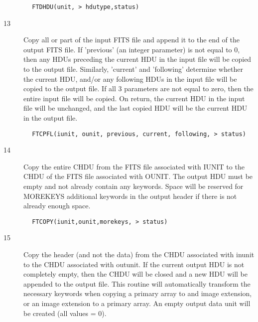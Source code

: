 \documentclass[11pt]{book}
\begin{document}
\begin{verbatim}
        FTDHDU(unit, > hdutype,status)
\end{verbatim}

\begin{description}
\item[13]  Copy all or part of the input FITS file and append it
    to the end of the output FITS file.  If 'previous' (an integer parameter) is
    not equal to 0, then any HDUs preceding the current HDU in the input file
    will be copied to the output file.  Similarly, 'current' and 'following'
    determine whether the current HDU, and/or any following HDUs in the input
    file will be copied to the output file. If all 3 parameters are not equal
    to zero, then the entire input file will be copied.  On return, the current
    HDU in the input file will be unchanged, and the last copied HDU will be the
   current HDU in the output file.
\end{description}

\begin{verbatim}
        FTCPFL(iunit, ounit, previous, current, following, > status)
\end{verbatim}

\begin{description}
\item[14] Copy the entire CHDU from the FITS file associated with IUNIT to the CHDU
    of the FITS file associated with OUNIT. The output HDU must be empty and
    not already contain any keywords.  Space will be reserved for MOREKEYS
    additional  keywords in the output header if there is not already enough
   space.
\end{description}

\begin{verbatim}
        FTCOPY(iunit,ounit,morekeys, > status)
\end{verbatim}

\begin{description}
\item[15] Copy the header (and not the data) from the CHDU associated with inunit
    to the CHDU associated with outunit.  If the current output HDU
    is not completely empty, then the CHDU will be closed and a new
    HDU will be appended to the output file.  This routine will automatically
    transform the necessary keywords when copying a primary array to
    and image extension, or an image extension to a primary array.
   An empty output data unit will be created (all values = 0).
\end{description}
\end{document}
